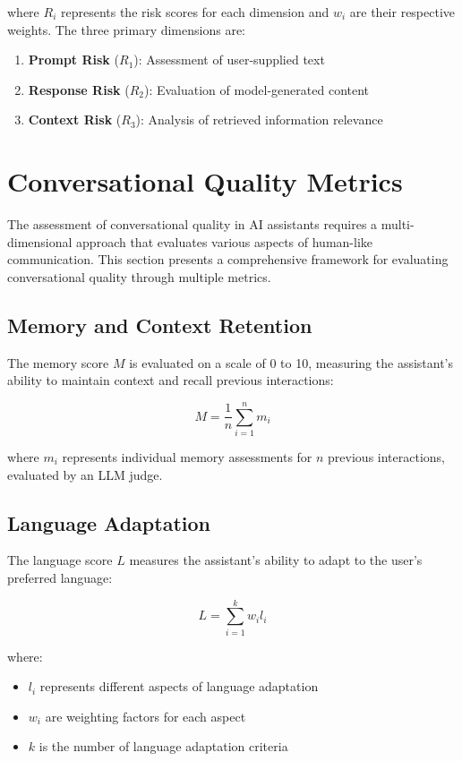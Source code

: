 \documentclass[12pt]{article}
\begin{document}
where $R_i$ represents the risk scores for each dimension and $w_i$ are their respective weights. The three primary dimensions are:

\begin{enumerate}
    \item \textbf{Prompt Risk} ($R_1$): Assessment of user-supplied text
    \item \textbf{Response Risk} ($R_2$): Evaluation of model-generated content
    \item \textbf{Context Risk} ($R_3$): Analysis of retrieved information relevance
\end{enumerate}

\section{Conversational Quality Metrics}

The assessment of conversational quality in AI assistants requires a multi-dimensional approach that evaluates various aspects of human-like communication. This section presents a comprehensive framework for evaluating conversational quality through multiple metrics.

\subsection{Memory and Context Retention}

The memory score $M$ is evaluated on a scale of 0 to 10, measuring the assistant's ability to maintain context and recall previous interactions:

\begin{equation}
    M = \frac{1}{n}\sum_{i=1}^{n} m_i
\end{equation}

where $m_i$ represents individual memory assessments for $n$ previous interactions, evaluated by an LLM judge.

\subsection{Language Adaptation}

The language score $L$ measures the assistant's ability to adapt to the user's preferred language:

\begin{equation}
    L = \sum_{i=1}^{k} w_i l_i
\end{equation}

where:
\begin{itemize}
    \item $l_i$ represents different aspects of language adaptation
    \item $w_i$ are weighting factors for each aspect
    \item $k$ is the number of language adaptation criteria
\end{itemize}
\end{document}
